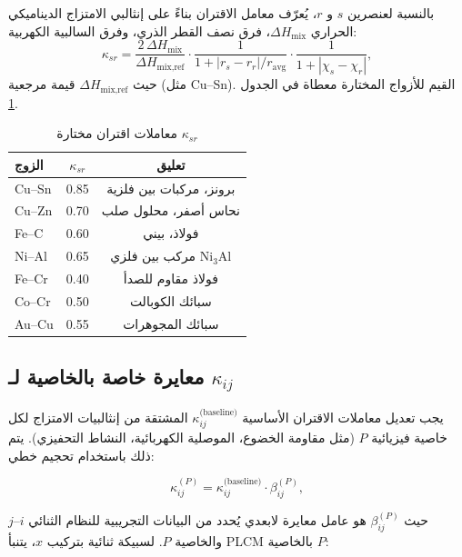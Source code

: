 \documentclass[11pt,a4paper]{article}
\begin{document}
\begin{otherlanguage}{arabic}
		بالنسبة لعنصرين \(s\) و \(r\)، يُعرّف معامل الاقتران بناءً على إنثالبي الامتزاج الديناميكي الحراري \(\Delta H_{\text{mix}}\)، فرق نصف القطر الذري، وفرق السالبية الكهربية:
		\[
		\kappa_{sr} = \frac{2\,\Delta H_{\text{mix}}}{\Delta H_{\text{mix,ref}}} \cdot
		\frac{1}{1 + |r_s - r_r|/r_{\text{avg}}} \cdot
		\frac{1}{1 + |\chi_s - \chi_r|},
		\]
		حيث \(\Delta H_{\text{mix,ref}}\) قيمة مرجعية (مثل Cu–Sn). القيم للأزواج المختارة معطاة في الجدول \ref{tab:kappa}.
		
		\begin{table}[htbp]
			\centering
			\caption{معاملات اقتران مختارة \(\kappa_{sr}\)}
			\label{tab:kappa}
			\begin{tabular}{lcc}
				\toprule
				الزوج & \(\kappa_{sr}\) & تعليق \\
				\midrule
				Cu–Sn & 0.85 & برونز، مركبات بين فلزية \\
				Cu–Zn & 0.70 & نحاس أصفر، محلول صلب \\
				Fe–C  & 0.60 & فولاذ، بيني \\
				Ni–Al & 0.65 & مركب بين فلزي Ni\(_{3}\)Al \\
				Fe–Cr & 0.40 & فولاذ مقاوم للصدأ \\
				Co–Cr & 0.50 & سبائك الكوبالت \\
				Au–Cu & 0.55 & سبائك المجوهرات \\
				\bottomrule
			\end{tabular}
		\end{table}
		
		\subsection{معايرة خاصة بالخاصية لـ \(\kappa_{ij}\)}
		\label{subsec:property-calibration}
		
		يجب تعديل معاملات الاقتران الأساسية \(\kappa_{ij}^{\text{(baseline)}}\) المشتقة من إنثالبيات الامتزاج لكل خاصية فيزيائية \(P\) (مثل مقاومة الخضوع، الموصلية الكهربائية، النشاط التحفيزي). يتم ذلك باستخدام تحجيم خطي:
		
		\begin{equation}
			\kappa_{ij}^{(P)} = \kappa_{ij}^{\text{(baseline)}} \cdot \beta_{ij}^{(P)},
			\label{eq:kappa-calibration}
		\end{equation}
		
		حيث \(\beta_{ij}^{(P)}\) هو عامل معايرة لابعدي يُحدد من البيانات التجريبية للنظام الثنائي \(i\)–\(j\) والخاصية \(P\). لسبيكة ثنائية بتركيب \(x\)، يتنبأ PLCM بالخاصية \(P\):
		

\end{otherlanguage}
\end{document}
